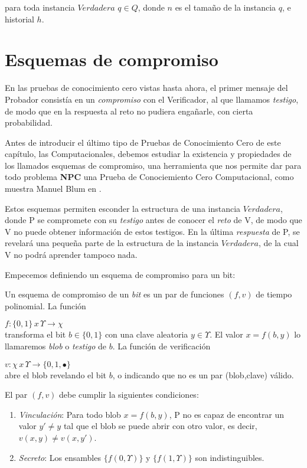 para toda instancia $Verdadera$ $q\in Q$, donde $n$ es el tamaño de la instancia $q$, e historial $h$. 

\hfil


\section{Esquemas de compromiso}\label{bitcommitment}

En las pruebas de conocimiento cero vistas hasta ahora, el primer mensaje del Probador consistía en un \textit{compromiso} con el Verificador, al que llamamos \textit{testigo}, de modo que en la respuesta al reto no pudiera engañarle, con cierta probabilidad.


Antes de introducir el último tipo de Pruebas de Conocimiento Cero de este capítulo, las Computacionales, debemos estudiar la existencia y propiedades de los llamados esquemas de compromiso, una herramienta que nos permite dar para todo problema \textbf{NPC} una Prueba de Conociemiento Cero Computacional, como muestra Manuel Blum en  \citep{blum}.

Estos esquemas permiten esconder la estructura de una instancia $Verdadera$, donde P se compromete con su \textit{testigo} antes de conocer el \textit{reto} de V, de modo que V no puede obtener información de estos testigos. En la última \textit{respuesta} de P, se revelará una pequeña parte de la estructura de la instancia $Verdadera$, de la cual V no podrá aprender tampoco nada.


Empecemos definiendo un esquema de compromiso para un bit:


\begin{definition}\label{commit:def}
	Un esquema de compromiso de un \textit{bit} es un par de funciones $(f,v)$ de tiempo polinomial. La función
	
	$
	f:\{0,1\}\, x\, \Upsilon \to \chi
	$
	\\transforma el bit $b\in \{0,1\}$ con una clave aleatoria $y\in \Upsilon$. El valor $x=f(b,y)$ lo llamaremos \textit{blob} o \textit{testigo} de $b$. La función de verificación
	
	$
	v:\chi \, x \, \Upsilon \to \{0,1,\bullet\}
	$
	\\abre el blob revelando el bit $b$, o indicando que no es un par (blob,clave) válido.
	
	El par $(f,v)$ debe cumplir la siguientes condiciones:
	\begin{enumerate}
		\item \textit{Vinculación}: Para todo blob $x=f(b,y)$, P no es capaz de encontrar un valor $y' \neq y$ tal que el blob se puede abrir con otro valor, es decir, $v(x,y) \neq v(x,y')$.
		
		\item \textit{Secreto}: Los ensambles $\{f(0,\Upsilon)\}$ y $\{f(1,\Upsilon)\}$ son indistinguibles.
	\end{enumerate}
	
\end{definition}


